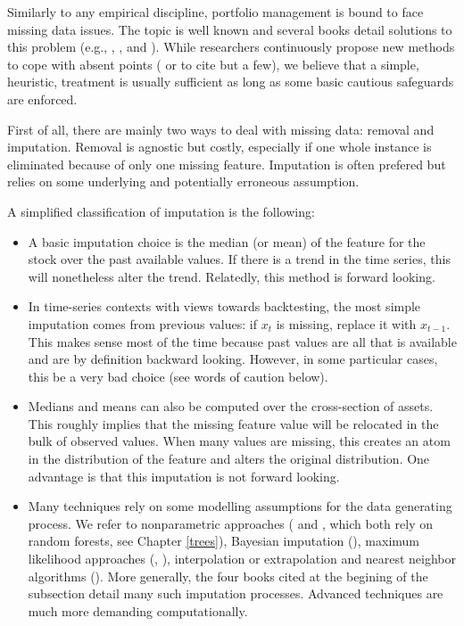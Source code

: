 \documentclass[]{krantz}
\providecommand{\tightlist}{%
  \setlength{\itemsep}{0pt}\setlength{\parskip}{0pt}}
\theoremstyle{definition}
\theoremstyle{definition}
\theoremstyle{definition}
\theoremstyle{remark}
\begin{document}
Similarly to any empirical discipline, portfolio management is bound to
face missing data issues. The topic is well known and several books
detail solutions to this problem (e.g., \citet{allison2001missing},
\citet{enders2010applied}, \citet{little2014statistical} and
\citet{van2018flexible}). While researchers continuously propose new
methods to cope with absent points (\citet{honaker2010missing} or
\citet{che2018recurrent} to cite but a few), we believe that a simple,
heuristic, treatment is usually sufficient as long as some basic
cautious safeguards are enforced.

First of all, there are mainly two ways to deal with missing data:
removal and imputation. Removal is agnostic but costly, especially if
one whole instance is eliminated because of only one missing feature.
Imputation is often prefered but relies on some underlying and
potentially erroneous assumption.

A simplified classification of imputation is the following:

\begin{itemize}
\tightlist
\item
  A basic imputation choice is the median (or mean) of the feature for
  the stock over the past available values. If there is a trend in the
  time series, this will nonetheless alter the trend. Relatedly, this
  method is forward looking.\\
\item
  In time-series contexts with views towards backtesting, the most
  simple imputation comes from previous values: if \(x_t\) is missing,
  replace it with \(x_{t-1}\). This makes sense most of the time because
  past values are all that is available and are by definition backward
  looking. However, in some particular cases, this be a very bad choice
  (see words of caution below).
\item
  Medians and means can also be computed over the cross-section of
  assets. This roughly implies that the missing feature value will be
  relocated in the bulk of observed values. When many values are
  missing, this creates an atom in the distribution of the feature and
  alters the original distribution. One advantage is that this
  imputation is not forward looking.\\
\item
  Many techniques rely on some modelling assumptions for the data
  generating process. We refer to nonparametric approaches
  (\citet{stekhoven2011missforest} and \citet{shah2014comparison}, which
  both rely on random forests, see Chapter \ref{trees}), Bayesian
  imputation (\citet{schafer1999multiple}), maximum likelihood
  approaches (\citet{enders2001primer}, \citet{enders2010applied}),
  interpolation or extrapolation and nearest neighbor algorithms
  (\citet{garcia2009k}). More generally, the four books cited at the
  begining of the subsection detail many such imputation processes.
  Advanced techniques are much more demanding computationally.
\end{itemize}
\end{document}
